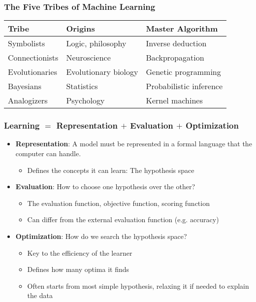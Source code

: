 \documentclass[UTF8,11pt,colorlinks,compress,openany]{beamer}%
\begin{document}
\begin{frame}\frametitle{The Five Tribes of Machine Learning}
\begin{table}
\abovetabulinesep=1mm
\belowtabulinesep=1mm
\begin{tabu}{l|l|l}
\hline
\textbf{Tribe} &\textbf{Origins} &\textbf{Master Algorithm}\\
\hline
Symbolists &Logic, philosophy &Inverse deduction\\
\hline
Connectionists &Neuroscience &Backpropagation\\
\hline
Evolutionaries &Evolutionary biology &Genetic programming\\
\hline
Bayesians &Statistics &Probabilistic inference\\
\hline
Analogizers &Psychology &Kernel machines\\
\hline
\end{tabu}
\end{table}
\end{frame}

\begin{frame}\frametitle{Learning $=$ Representation $+$ Evaluation $+$ Optimization}
\begin{itemize}
		\item \textbf{Representation}: A model must be represented in a formal language that the computer can handle.
		\begin{itemize}
			\item Defines the concepts it can learn: The hypothesis space
		\end{itemize}
		\item \textbf{Evaluation}: How to choose one hypothesis over the other?
		\begin{itemize}
			\item The evaluation function, objective function, scoring function
			\item Can differ from the external evaluation function (e.g. accuracy)
		\end{itemize}
		\item \textbf{Optimization}: How do we search the hypothesis space?
		\begin{itemize}
			\item Key to the efficiency of the learner
			\item Defines how many optima it finds
			\item Often starts from most simple hypothesis, relaxing it if needed to explain the data
		\end{itemize}
	\end{itemize}	
\end{frame}
\end{document}
